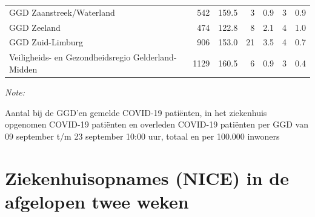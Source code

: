 \documentclass[
  english,
  man,floatsintext]{apa6}
\begin{document}
\begin{table}
\begin{threeparttable}
\begin{tabular}{lrrrrrr}
GGD Zaanstreek/Waterland & 542 & 159.5 & 3 & 0.9 & 3 & 0.9\\
GGD Zeeland & 474 & 122.8 & 8 & 2.1 & 4 & 1.0\\
GGD Zuid-Limburg & 906 & 153.0 & 21 & 3.5 & 4 & 0.7\\
Veiligheids- en Gezondheidsregio Gelderland-Midden & 1129 & 160.5 & 6 & 0.9 & 3 & 0.4\\
\bottomrule
\end{tabular}
\begin{tablenotes}
\item \textit{Note: } 
\item Aantal bij de GGD’en gemelde COVID-19 patiënten, in het ziekenhuis opgenomen COVID-19 patiënten en overleden COVID-19 patiënten per GGD van 09 september t/m 23 september 10:00 uur, totaal en per 100.000 inwoners
\end{tablenotes}
\end{threeparttable}
\endgroup{}
\end{table}

\newpage

\hypertarget{ziekenhuisopnames-nice-in-de-afgelopen-twee-weken}{%
\section{Ziekenhuisopnames (NICE) in de afgelopen twee weken}\label{ziekenhuisopnames-nice-in-de-afgelopen-twee-weken}}
\end{document}
